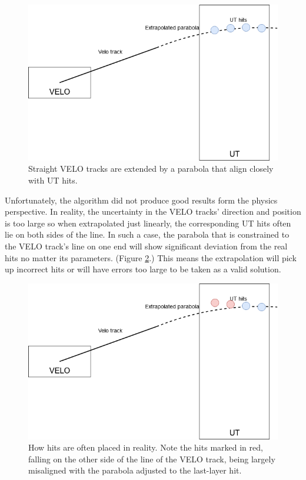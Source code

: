 \documentclass[12pt]{article}
\begin{document}
\begin{figure}[H]
	\begin{center}
		\includegraphics[width=.75\textwidth]{velout_parabola_fit}
	\end{center}
	\caption[Parabolic extension of VELO tracks]{Straight VELO tracks are extended by a parabola that align closely with UT hits.}
	\label{fig_velout_parabola_fit}
\end{figure}


Unfortunately, the algorithm did not produce good results form the physics perspective. In reality, the uncertainty in the VELO tracks' direction and position is too large so when extrapolated just linearly, the corresponding UT hits often lie on both sides of the line. In such a case, the parabola that is constrained to the VELO track's line on one end will show significant deviation from the real hits no matter its parameters. (Figure \ref{fig_velout_parabola_misfit}.) This means the extrapolation will pick up incorrect hits or will have errors too large to be taken as a valid solution.

\begin{figure}[H]
	\begin{center}
		\includegraphics[width=.75\textwidth]{velout_parabola_misfit}
	\end{center}
	\caption[Misalignment of parabolic extension to UT hits]{How hits are often placed in reality. Note the hits marked in red, falling on the other side of the line of the VELO track, being largely misaligned with the parabola adjusted to the last-layer hit.}
	\label{fig_velout_parabola_misfit}
\end{figure}
\end{document}
